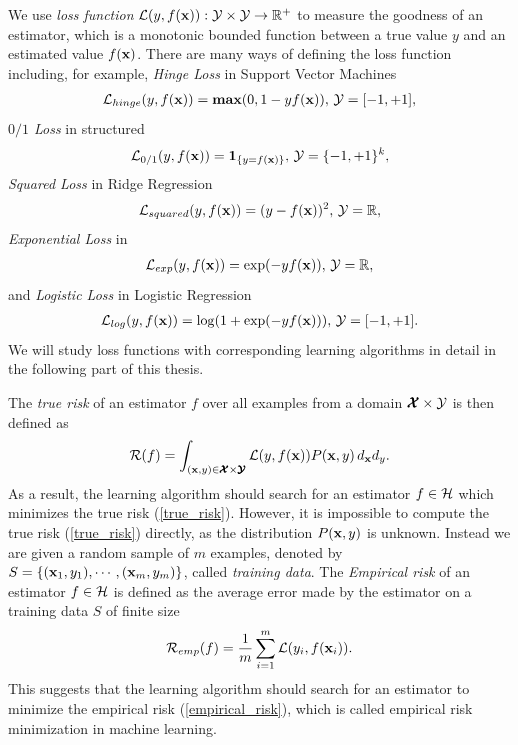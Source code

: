 We use \textit{loss function} $\mathcal{L}(y,f(\mathbf {x})):\mathcal{Y}\times\mathcal{Y}\rightarrow\mathbb{R}^+$ to measure the goodness of an estimator, which is a monotonic bounded function between a true value $y$ and an estimated value $f(\mathbf {x})$.
There are many ways of defining the loss function including, for example,
\textit{Hinge Loss} in Support Vector Machines \citep{Cortes95support}
\begin{align}
	\mathcal{L}_{hinge}(y,f(\mathbf {x})) = \textbf{max} (0,1-y f(\mathbf {x})),\, \mathcal{Y}=[-1,+1], \label{hinge_loss}
\end{align}
\textit{$0/1$ Loss} in structured \svm\ \citep{THJA04}
\begin{align}
	\mathcal{L}_{0/1}(y,f(\mathbf {x})) = \mathbf{1}_{\{y=f(\mathbf {x})\}},\, \mathcal{Y} = \{-1,+1\}^k, \label{one_loss}
\end{align}
\textit{Squared Loss} in Ridge Regression \citep{Hoerl00ridge}
\begin{align*}
	\mathcal{L}_{squared}(y,f(\mathbf {x})) = (y-f(\mathbf {x}))^2,\, \mathcal{Y}=\mathbb{R},
\end{align*}
\textit{Exponential Loss} in \adaboost\ \citep{Schapire99improved}
\begin{align}
	\mathcal{L}_{exp}(y,f(\mathbf {x})) = \exp(-y f(\mathbf {x})),\, \mathcal{Y}=\mathbb{R}, \label{exp_loss}
\end{align}
and \textit{Logistic Loss} in Logistic Regression \citep{Chen99}
\begin{align}
	\mathcal{L}_{log}(y,f(\mathbf {x})) = \log(1+\exp(-y f(\mathbf {x}))),\, \mathcal{Y}=[-1,+1]. \label{log_loss}
\end{align}
We will study loss functions with corresponding learning algorithms in detail in the following part of this thesis.

The \textit{true risk} of an estimator $f$ over all examples from a domain $\pmb {\mathcal{X}}\times\mathcal{Y}$ is then defined as
\begin{align}
	\mathcal{R}(f) = \int_{(\mathbf {x},y)\in\pmb {\mathcal{X}}\times\pmb {\mathcal{Y}}}\mathcal{L}(y,f(\mathbf {x}))P(\mathbf {x},y)\,d_{\mathbf {x}}d_{y} \label{true_risk}.
\end{align}
As a result, the learning algorithm should search for an estimator $f\in\mathcal{H}$ which minimizes the true risk (\ref{true_risk}).
However, it is impossible to compute the true risk (\ref{true_risk}) directly, as the distribution $P(\mathbf {x},y)$ is unknown.
Instead we are given a random sample of $m$ examples, denoted by $S=\{(\mathbf {x}_1,y_1),\cdots,(\mathbf {x}_m,y_m)\}$, called \textit{training data}.
The \textit{Empirical risk} of an estimator $f\in\mathcal{H}$ is defined as the average error made by the estimator on a training data $S$ of finite size
\begin{align}
	\mathcal{R}_{emp}(f) = \frac{1}{m}\sum_{i=1}^{m}\mathcal{L}(y_i,f(\mathbf {x}_i)) \label{empirical_risk}.
\end{align}
This suggests that the learning algorithm should search for an estimator to minimize the empirical risk (\ref{empirical_risk}), which is called {empirical risk minimization} \citep{Vapnik92principles} in machine learning.


